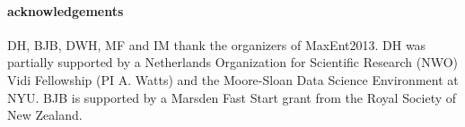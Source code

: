 \documentclass[12pt]{emulateapj}
\begin{document}
\paragraph{acknowledgements}
DH, BJB, DWH, MF and IM thank the organizers of MaxEnt2013. DH was partially supported by a Netherlands Organization for Scientific Research (NWO) Vidi Fellowship (PI A. Watts) and the Moore-Sloan Data Science Environment at NYU. BJB is supported
by a Marsden Fast Start grant from the Royal Society of New Zealand.



\end{document}
